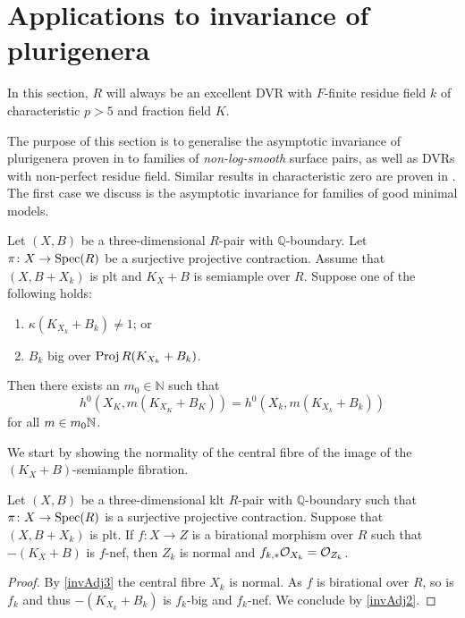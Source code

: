 \section{Applications to invariance of plurigenera}\label{s-inv-plurigenera}
	
	
	In this section, $R$ will always be an excellent DVR with $F$-finite residue field $k$ of characteristic $p>5$ and fraction field $K$. 
	
	The purpose of this section is to generalise the asymptotic invariance of plurigenera proven in \cite[Theorem 3.1]{EH} to families of \emph{non-log-smooth} surface pairs, as well as DVRs with non-perfect residue field. Similar results in characteristic zero are proven in \cite{HMX13, HMX18}.
	The first case we discuss is the asymptotic invariance for families of good minimal models.
	
	\begin{theorem}\label{thm:ADIOP_SA}
		Let $(X,B)$ be a three-dimensional $R$-pair with $\mathbb{Q}$-boundary.
		Let $\pi \colon X \to\Spec (R)$ be a  surjective projective contraction. Assume that $(X,B+X_k)$ is plt and $K_X+B$ is semiample over $R$.
		Suppose one of the following holds:
		\begin{enumerate}
			\item $\kappa(K_{X_k}+B_k)\neq 1$; or
			\item  $B_k$ big over $\Proj R(K_{X_k}+B_k)$.
		\end{enumerate} 
		Then there exists an $m_{0} \in \mathbb{N}$ such that 
		$$h^0(X_K,m(K_{X_K}+B_K))=h^0(X_k,m(K_{X_k}+B_k))$$
		for all $m\in m_0\bN$.
	\end{theorem}
	
	We start by showing the normality of the central fibre of the image of the $(K_X+B)$-semiample fibration.
	
	\begin{proposition}\label{p-gen-case}
		Let $(X,B)$ be a three-dimensional klt $R$-pair with $\mathbb{Q}$-boundary such that $\pi \colon X \to\Spec (R)$ is a surjective projective contraction.
		Suppose that $(X,B+X_{k})$ is plt. If $f \colon X \to Z$ is a birational morphism over $R$ such that $-(K_{X}+B)$ is $f$-nef, then $Z_k$ is normal and $f_{k,*}\ox[X_{k}]=\ox[Z_{k}]$.
	\end{proposition}
	
	\begin{proof}
		By \autoref{invAdj3} the central fibre $X_{k}$ is normal. 
		As $f$ is birational over $R$, so is $f_{k}$ and thus $-(K_{X_{k}}+B_{k})$ is $f_{k}$-big and $f_k$-nef. We conclude by \autoref{invAdj2}.
	\end{proof}
	
